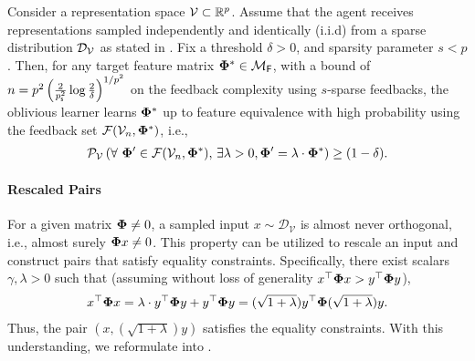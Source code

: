 \begin{theorem}\label{thm: samplingsparse}
    Consider a representation space ${\mathcal{V}} \subset \mathbb{R}^p$. Assume that the agent receives representations sampled independently and identically (i.i.d) from a sparse distribution ${\mathcal{D}}_{{\mathcal{V}}}$ as stated in . Fix a threshold $\delta > 0$, and sparsity parameter $s < p$. Then, for any target feature matrix $\boldsymbol{\Phi}^* \in \mathcal{M}_{\textsf{F}}$, with a bound of $n = p^2  \left( {\frac{2}{p_{\textsf{s}}^2} \log \frac{2}{\delta}} \right) ^{1/p^2}$ on the feedback complexity using $s$-sparse feedbacks, the oblivious learner learns $\boldsymbol{\Phi}^*$ up to feature equivalence with high probability using the feedback set ${\mathcal{F}}({\mathcal{V}}_n,\boldsymbol{\Phi}^*)$, i.e.,
     \begin{align*}
        {\mathcal{P}}_{{\mathcal{V}}}  \left( {\forall\,\, \boldsymbol{\Phi}' \in {\mathcal{F}}({\mathcal{V}}_n,\boldsymbol{\Phi}^*),\, \exists \lambda > 0, \boldsymbol{\Phi}' = \lambda\cdot \boldsymbol{\Phi}^* } \right)  \ge (1 - \delta).
    \end{align*}
\end{theorem}
\fi

\paragraph{Rescaled Pairs} For a given matrix \( \boldsymbol{\Phi} \neq 0 \), a sampled input \( x \sim \mathcal{D}_{\mathcal{V}} \) is almost never orthogonal, i.e., almost surely \( \boldsymbol{\Phi} x \neq 0 \). This property can be utilized to rescale an input and construct pairs that satisfy equality constraints. Specifically, there exist scalars \( \gamma, \lambda > 0 \) such that (assuming without loss of generality \( x^{\top}\boldsymbol{\Phi} x > y^{\top}\boldsymbol{\Phi} y \)),
\begin{align*}
    x^{\top}\boldsymbol{\Phi} x = \lambda \cdot y^{\top}\boldsymbol{\Phi} y + y^{\top}\boldsymbol{\Phi} y = (\sqrt{1 + \lambda}) y^{\top}\boldsymbol{\Phi} (\sqrt{1 + \lambda}) y.
\end{align*}
Thus, the pair \( (x, (\sqrt{1 + \lambda})y) \) satisfies the equality constraints. With this understanding, we reformulate  into . 

